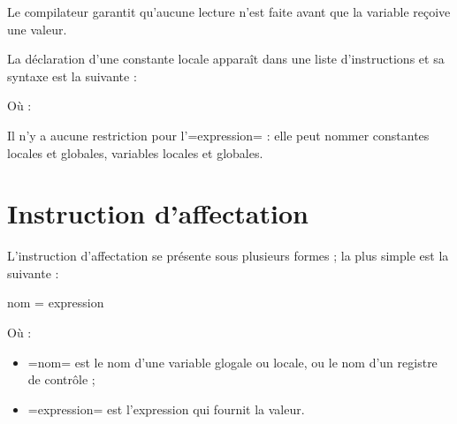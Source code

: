 Le compilateur garantit qu'aucune lecture n'est faite avant que la variable reçoive une valeur.











La déclaration d'une constante locale apparaît dans une liste d'instructions et sa syntaxe est la suivante :


Où :

Il n'y a aucune restriction pour l'\plm=expression= : elle peut nommer constantes locales et globales, variables locales et globales.






\section {Instruction d'affectation}

L'instruction d'affectation se présente sous plusieurs formes ; la plus simple est la suivante :

\begin{PLM}
nom = expression
\end{PLM}

Où :
\begin{itemize}
  \item \plm=nom= est le nom d'une variable glogale ou locale, ou le nom d'un registre de contrôle ;
  \item \plm=expression= est l'expression qui fournit la valeur.
\end{itemize}









